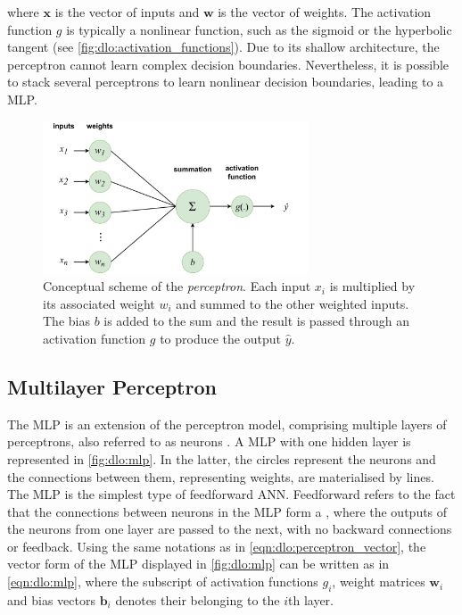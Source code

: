\noindent where $\mathbf{x}$ is the vector of inputs and $\mathbf{w}$ is the
vector of weights. The activation function $g$ is typically a nonlinear
function, such as the sigmoid or the hyperbolic tangent (see
\cref{fig:dlo:activation_functions}). Due to its shallow architecture, the
perceptron cannot learn complex decision boundaries. Nevertheless, it is
possible to stack several perceptrons to learn nonlinear decision boundaries,
leading to a \acl{MLP}.\\

\begin{figure}[htbp]
  \centering
  \includegraphics[width=0.7\textwidth]{chapter_dlo/assets/perceptron_scheme.pdf}
  \caption{Conceptual scheme of the \emph{perceptron}. Each input $x_i$ is multiplied
  by its associated weight $w_i$ and summed to the other weighted inputs. The
  bias $b$ is added to the sum and the result is passed through an activation
  function $g$ to produce the output $\hat{y}$.}
  \label{fig:dlo:perceptron}
\end{figure}

\subsection{Multilayer Perceptron}\label{sec:dlo:mlp}

The \acf{MLP} is an extension of the perceptron model, comprising multiple
layers of perceptrons, also referred to as neurons \cite{rumelhart1986learning}.
A \ac{MLP} with one hidden layer is represented in \cref{fig:dlo:mlp}. In the
latter, the circles represent the neurons and the connections between them,
representing weights, are materialised by lines. The \ac{MLP} is the simplest
type of feedforward \ac{ANN}. Feedforward refers to the fact that the
connections between neurons in the \ac{MLP} form a \DIFdelbegin %
\DIFdelend \DIFaddbegin {}\DIFaddend , where
the outputs of the neurons from one layer are passed to the next, with no
backward connections or feedback. Using the same notations as in
\cref{eqn:dlo:perceptron_vector}, the vector form of the \ac{MLP} displayed in
\cref{fig:dlo:mlp} can be written as in \cref{eqn:dlo:mlp}, where the subscript
of activation functions $g_i$, weight matrices $\mathbf{w}_i$ and bias vectors
$\mathbf{b}_i$ denotes their belonging to the $i$th layer.\\

